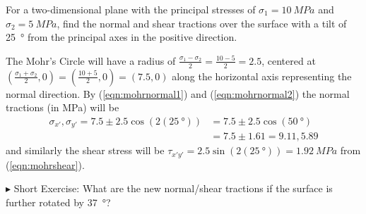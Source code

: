 \begin{exmp}
For a two-dimensional plane with the principal stresses of $\sigma_1 = \SI{10}{MPa}$ and $\sigma_2 = \SI{5}{MPa}$, find the normal and shear tractions over the surface with a tilt of \SI{25}{\degree} from the principal axes in the positive direction.
\end{exmp}
\begin{solution}
The Mohr's Circle will have a radius of $\frac{\sigma_1 - \sigma_2}{2} = \frac{10-5}{2} = 2.5$, centered at $(\frac{\sigma_1 + \sigma_2}{2}, 0) = (\frac{10 + 5}{2}, 0) = (7.5,0)$ along the horizontal axis representing the normal direction. By (\ref{eqn:mohrnormal1}) and (\ref{eqn:mohrnormal2}) the normal tractions (in \si{MPa}) will be
\begin{align*}
\sigma_{x'}, \sigma_{y'} = 7.5 \pm 2.5 \cos(2(\SI{25}{\degree})) &= 7.5 \pm 2.5 \cos(\SI{50}{\degree}) \\
&= 7.5 \pm 1.61 = 9.11, 5.89
\end{align*}
and similarly the shear stress will be $\tau_{x'y'} = 2.5\sin(2(\SI{25}{\degree})) = \SI{1.92}{MPa}$ from (\ref{eqn:mohrshear}).
\end{solution}
$\blacktriangleright$ Short Exercise: What are the new normal/shear tractions if the surface is further rotated by \SI{37}{\degree}?\footnotemark

